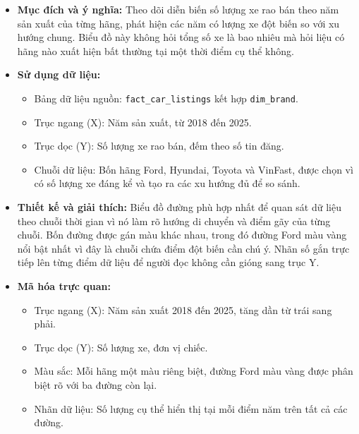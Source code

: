 \begin{itemize}
    \item \textbf{Mục đích và ý nghĩa:} Theo dõi diễn biến số lượng xe rao bán theo năm sản xuất của từng hãng, phát hiện các năm có lượng xe đột biến so với xu hướng chung. Biểu đồ này không hỏi tổng số xe là bao nhiêu mà hỏi liệu có hãng nào xuất hiện bất thường tại một thời điểm cụ thể không.

    \item \textbf{Sử dụng dữ liệu:}
    \begin{itemize}
        \item Bảng dữ liệu nguồn: \texttt{fact\_car\_listings} kết hợp \texttt{dim\_brand}.
        \item Trục ngang (X): Năm sản xuất, từ 2018 đến 2025.
        \item Trục dọc (Y): Số lượng xe rao bán, đếm theo số tin đăng.
        \item Chuỗi dữ liệu: Bốn hãng Ford, Hyundai, Toyota và VinFast, được chọn vì có số lượng xe đáng kể và tạo ra các xu hướng đủ để so sánh.
    \end{itemize}

    \item \textbf{Thiết kế và giải thích:} Biểu đồ đường phù hợp nhất để quan sát dữ liệu theo chuỗi thời gian vì nó làm rõ hướng di chuyển và điểm gãy của từng chuỗi. Bốn đường được gán màu khác nhau, trong đó đường Ford màu vàng nổi bật nhất vì đây là chuỗi chứa điểm đột biến cần chú ý. Nhãn số gắn trực tiếp lên từng điểm dữ liệu để người đọc không cần gióng sang trục Y.

    \item \textbf{Mã hóa trực quan:}
    \begin{itemize}
        \item Trục ngang (X): Năm sản xuất 2018 đến 2025, tăng dần từ trái sang phải.
        \item Trục dọc (Y): Số lượng xe, đơn vị chiếc.
        \item Màu sắc: Mỗi hãng một màu riêng biệt, đường Ford màu vàng được phân biệt rõ với ba đường còn lại.
        \item Nhãn dữ liệu: Số lượng cụ thể hiển thị tại mỗi điểm năm trên tất cả các đường.
    \end{itemize}


\end{itemize}
